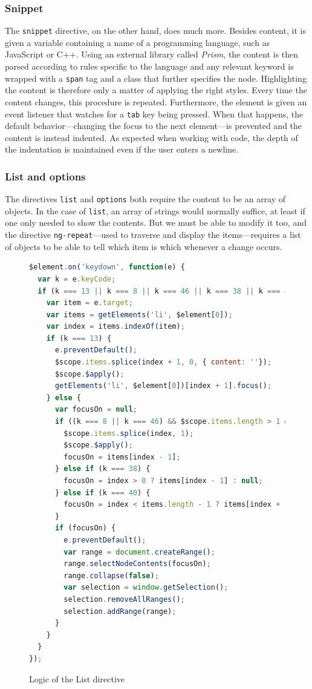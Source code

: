 \documentclass[thesis=M,english,hidelinks]{FITthesis}[2012/10/20]
\newcommand{\code}{\texttt}
\begin{document}
      \subsubsection{Snippet}

The \code{snippet} directive, on the other hand, does much more. Besides content, it is given a variable containing a name of a programming language, such as JavaScript or C++. Using an external library called \textit{Prism}, the content is then parsed according to rules specific to the language and any relevant keyword is wrapped with a \code{span} tag and a class that further specifies the node. Highlighting the content is therefore only a matter of applying the right styles. Every time the content changes, this procedure is repeated. Furthermore, the element is given an event listener that watches for a \code{tab} key being pressed. When that happens, the default behavior---changing the focus to the next element---is prevented and the content is instead indented. As expected when working with code, the depth of the indentation is maintained even if the user enters a newline.

      \subsubsection{List and options}

The directives \code{list} and \code{options} both require the content to be an array of objects. In the case of \code{list}, an array of strings would normally suffice, at least if one only needed to show the contents. But we must be able to modify it too, and the directive \code{ng-repeat}---used to traverse and display the items---requires a list of objects to be able to tell which item is which whenever a change occurs.

\begin{figure}
  \begin{lstlisting}[language=JavaScript]
$element.on('keydown', function(e) {
  var k = e.keyCode;
  if (k === 13 || k === 8 || k === 46 || k === 38 || k === 40) {
    var item = e.target;
    var items = getElements('li', $element[0]);
    var index = items.indexOf(item);
    if (k === 13) {
      e.preventDefault();
      $scope.items.splice(index + 1, 0, { content: ''});
      $scope.$apply();
      getElements('li', $element[0])[index + 1].focus();
    } else {
      var focusOn = null;
      if ((k === 8 || k === 46) && $scope.items.length > 1 && !$scope.items[index].content) {
        $scope.items.splice(index, 1);
        $scope.$apply();
        focusOn = items[index - 1];
      } else if (k === 38) {
        focusOn = index > 0 ? items[index - 1] : null;
      } else if (k === 40) {
        focusOn = index < items.length - 1 ? items[index + 1] : null;
      }
      if (focusOn) {
        e.preventDefault();
        var range = document.createRange();
        range.selectNodeContents(focusOn);
        range.collapse(false);
        var selection = window.getSelection();
        selection.removeAllRanges();
        selection.addRange(range);
      }
    }
  }
});
  \end{lstlisting}
  \caption{Logic of the List directive}
  \label{fig:list_directive}
\end{figure}
\end{document}
